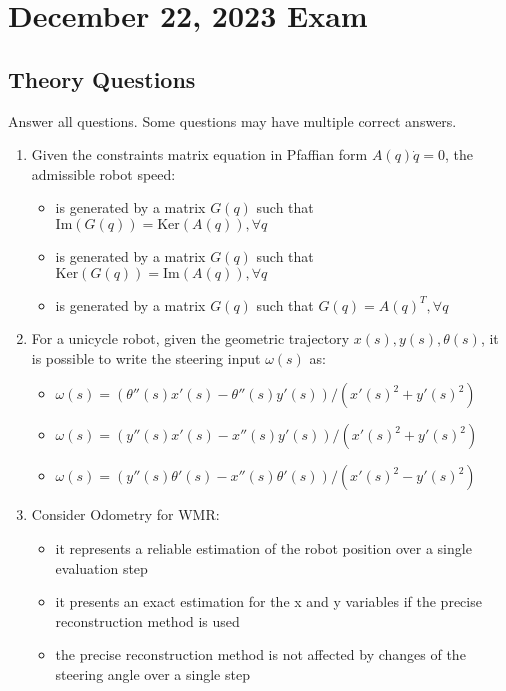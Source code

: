 \documentclass[openany]{book}
\theoremstyle{definition}
\theoremstyle{remark}
\begin{document}
\chapter{December 22, 2023 Exam}

\section*{Theory Questions}
Answer all questions. Some questions may have multiple correct answers.

\begin{enumerate}
    \item Given the constraints matrix equation in Pfaffian form $A(q)\dot{q} = 0$, the admissible robot speed:
    \begin{itemize}
        \item[\checkmark] is generated by a matrix $G(q)$ such that $\text{Im}(G(q)) = \text{Ker}(A(q)), \forall q$
        \item[] is generated by a matrix $G(q)$ such that $\text{Ker}(G(q)) = \text{Im}(A(q)), \forall q$
        \item[] is generated by a matrix $G(q)$ such that $G(q) = A(q)^T, \forall q$
    \end{itemize}

    \item For a unicycle robot, given the geometric trajectory $x(s), y(s), \theta(s)$, it is possible to write the steering input $\omega(s)$ as:
    \begin{itemize}
        \item[] $\omega(s) = (\theta''(s)x'(s) - \theta''(s)y'(s))/(x'(s)^2 + y'(s)^2)$
        \item[\checkmark] $\omega(s) = (y''(s)x'(s) - x''(s)y'(s))/(x'(s)^2 + y'(s)^2)$
        \item[] $\omega(s) = (y''(s)\theta'(s) - x''(s)\theta'(s))/(x'(s)^2 - y'(s)^2)$
    \end{itemize}

    \item Consider Odometry for WMR:
    \begin{itemize}
        \item[\checkmark] it represents a reliable estimation of the robot position over a single evaluation step
        \item[] it presents an exact estimation for the x and y variables if the precise reconstruction method is used
        \item[] the precise reconstruction method is not affected by changes of the steering angle over a single step
    \end{itemize}


\end{enumerate}
\end{document}
